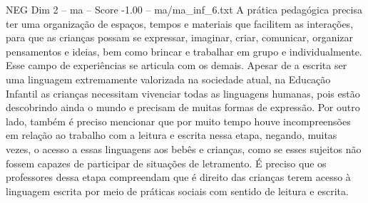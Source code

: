 \begin{textsample}{NEG Dim 2 – ma – Score -1.00 – ma/ma\_inf\_6.txt}
A prática pedagógica precisa ter uma organização de espaços, tempos e materiais que facilitem as interações, para que as crianças possam se expressar, imaginar, criar, comunicar, organizar pensamentos e ideias, bem como brincar e trabalhar em grupo e individualmente.
Esse campo de experiências se articula com os demais.
Apesar de a escrita ser uma linguagem extremamente valorizada na sociedade atual, na Educação Infantil as crianças necessitam vivenciar todas as linguagens humanas, pois estão descobrindo ainda o mundo e precisam de muitas formas de expressão.
Por outro lado, também é preciso mencionar que por muito tempo houve incompreensões em relação ao trabalho com a leitura e escrita nessa etapa, negando, muitas vezes, o acesso a essas linguagens aos bebês e crianças, como se esses sujeitos não fossem capazes de participar de situações de letramento.
É preciso que os professores dessa etapa compreendam que é direito das crianças terem acesso à linguagem escrita por meio de práticas sociais com sentido de leitura e escrita.

\end{textsample}
